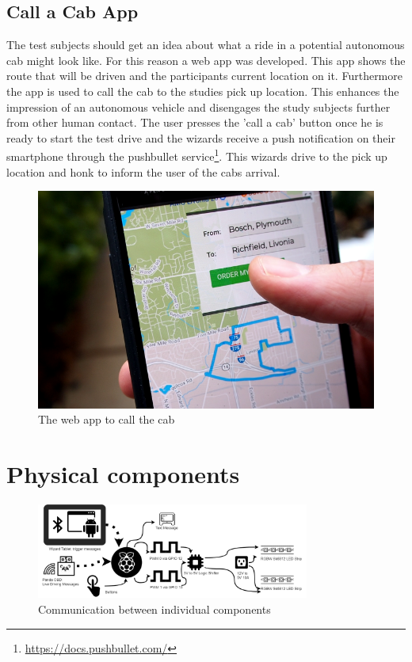 \section{Call a Cab App}
\label{sec:capp}
The test subjects should get an idea about what a ride in a potential autonomous cab might look like. For this reason a web app was developed. This app shows the route that will be driven and the participants current location on it. Furthermore the app is used to call the cab to the studies pick up location. This enhances the impression of an autonomous vehicle and disengages the study subjects further from other human contact. The user presses the 'call a cab' button once he is ready to start the test drive and the wizards receive a push notification on their smartphone through the pushbullet service\footnote{\url{https://docs.pushbullet.com/}}. This wizards drive to the pick up location and honk to inform the user of the cabs arrival. 

\begin{figure}
    \includegraphics[height=0.31\textwidth]{fig/capp}
    \caption[Call a Cab App]{The web app to call the cab}
    \label{fig:capp}
\end{figure}

\chapter{Physical components}

\begin{figure}
    \includegraphics[width=0.8\textwidth]{fig/wizardfinal}
    \caption[Communication Overview]{Communication between individual components}
    \label{fig:communication}
\end{figure}

